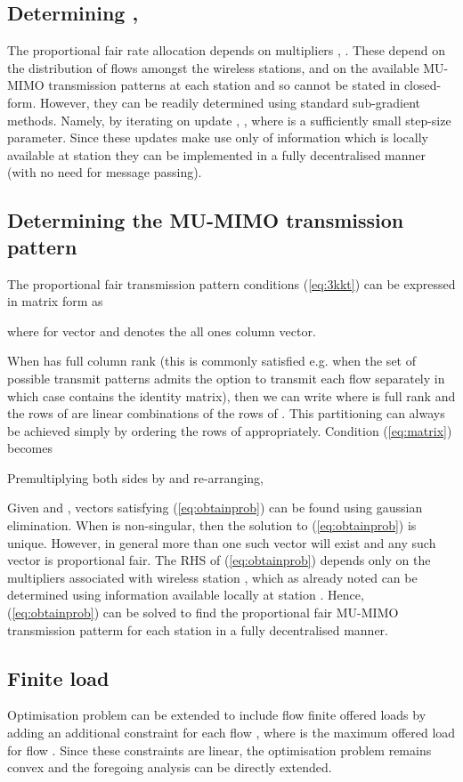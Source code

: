 \documentclass[11pt]{amsart}
\begin{document}
\subsection{Determining , }
The proportional fair rate allocation depends on multipliers , .   These depend on the distribution of flows amongst the wireless stations, and on the available MU-MIMO transmission patterns at each station and so cannot be stated in closed-form.   However, they can be readily determined using standard sub-gradient methods.  Namely, by iterating on update , , where  is a sufficiently small step-size parameter.   Since these updates make use only of information which is locally available at station  they can be implemented in a fully decentralised manner (with no need for message passing).

\subsection{Determining the MU-MIMO transmission pattern}\label{sec:patterns}
The proportional fair transmission pattern conditions (\ref{eq:3kkt}) can be expressed in matrix form as

where  for vector  and  denotes the all ones column vector.  

When  has full column rank  (this is commonly satisfied e.g. when the set of possible transmit patterns admits the option to transmit each flow separately in which case  contains the  identity matrix), then we can write  where  is full rank and the rows of  are linear combinations of the rows of  .  This partitioning can always be achieved simply by ordering the rows of  appropriately.    Condition (\ref{eq:matrix}) becomes

Premultiplying both sides by  and re-arranging,

Given  and , vectors  satisfying (\ref{eq:obtainprob}) can be found using gaussian elimination.   When  is non-singular, then the solution to (\ref{eq:obtainprob}) is unique.   However, in general more than one such vector will exist and any such vector is proportional fair.  The RHS of (\ref{eq:obtainprob}) depends only on the multipliers associated with wireless station , which as already noted can be determined using information available locally at station .  Hence, (\ref{eq:obtainprob}) can  be solved to find the proportional fair MU-MIMO transmission patterm for each station  in a fully decentralised manner.

\subsection{Finite load}
Optimisation problem  can be extended to include flow finite offered loads by adding an additional constraint  for each flow , where  is the maximum offered load for flow .  Since these constraints are linear, the optimisation problem remains convex and the foregoing analysis can be directly extended.
\end{document}

